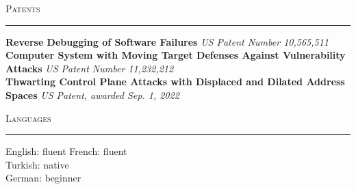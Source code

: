 \documentclass[10pt]{article}
\newcommand{\mysec}[1]{%
  \par\addvspace{2em}%
  \Needspace{8\baselineskip}%
  \noindent\textsc{\large #1}\par\vspace{1mm}\hrule\vspace{2mm}%
}
\newcommand{\mysub}[3]{\textbf{#1} {#2} \hfill {\em #3}}
\newcommand{\myssub}[1]{%
  \par\begingroup
    \leftskip=2mm\relax
    \noindent #1\par
  \endgroup
  \vspace{1mm}%
}
\begin{document}





\mysec{Patents}
\mysub{Reverse Debugging of Software Failures}{}{\rm US Patent Number 10,565,511\vspace{2mm}} \\
\mysub{Computer System with Moving Target Defenses Against Vulnerability Attacks}{}{\rm US Patent Number 11,232,212\vspace{2mm}} \\
\mysub{Thwarting Control Plane Attacks with Displaced and Dilated Address Spaces}{}{\rm US Patent, awarded Sep. 1, 2022\vspace{2mm}} \\

\mysec{Languages}


\myssub{English: fluent
French: fluent \\
Turkish: native \\
German: beginner}


\end{document}
